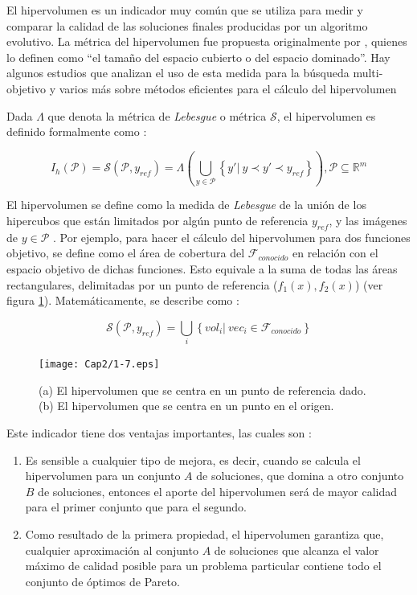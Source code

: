   El hipervolumen es un indicador muy com\'un que se utiliza para medir y comparar la calidad de las soluciones
  finales producidas por un algoritmo evolutivo. La m\'etrica del hipervolumen fue propuesta originalmente por
  \cite{Zitzler98on}, quienes lo definen como ``el tama\~no del espacio cubierto o del espacio dominado''. Hay algunos 
  estudios que analizan el uso de esta medida para la b\'usqueda multi-objetivo y varios m\'as sobre m\'etodos eficientes para 
  el c\'alculo del hipervolumen \cite{FonPaqhypervolume, BeuFon2009, Emmerich05anemo}

   \begin{definicion}  Dada $\Lambda$ que denota la m\'etrica de \textit{Lebesgue} 
   o m\'etrica $\mathcal{S}$, el hipervolumen es definido formalmente como \cite{EASMC}:

  \[
  I_h\left(\mathcal{P}\right) = \mathcal{S}(\mathcal{P},y_{ref}) = \Lambda \left(\bigcup_{y \in \mathcal{P}} \left\{ y' |~ y \prec y' \prec y_{ref} \right\} \right), 
  \mathcal{P} \subseteq \mathbb{R}^m
  \]
  
  El hipervolumen se define como la medida de \textit{Lebesgue} de la uni\'on de los hipercubos que est\'an limitados 
  por alg\'un punto de referencia $y_{ref}$, y las im\'agenes de $y \in \mathcal{P}$ \cite{zbt2006}. Por ejemplo,  para hacer el  
  c\'alculo del hipervolumen para dos funciones objetivo, se define como el \'area de cobertura del 
  $\mathcal{F}_{conocido}$ en  relaci\'on con el espacio objetivo de dichas funciones. Esto equivale a la suma de todas las \'areas 
  rectangulares, delimitadas por un punto de referencia ($f_1\left(x \right), f_2\left(x\right)$) (ver figura \ref{fig:hipervol}). 
  Matem\'aticamente, se describe como \cite{EASMC}:

 \[
  \mathcal{S}(\mathcal{P},y_{ref}) = \bigcup_{i} \left\{vol_i |~ vec_i \in \mathcal{F}_{conocido} \right\}
  \]
  \end{definicion}
  
 \begin{figure}
	\centering
	\texttt{[image: Cap2/1-7.eps]}
	  \caption [Hipervolumen por punto de referencia]{(a) El hipervolumen que se centra en un punto de referencia dado. 
	  (b) El hipervolumen que se centra en un punto en el origen.}
      \label{fig:hipervol}
      \end{figure}
 
  Este indicador tiene dos ventajas importantes, las cuales son \cite{zbt2006}:
  
  \begin{enumerate}
   \item  Es sensible a cualquier tipo de mejora, es decir, cuando se calcula el hipervolumen para un conjunto $A$ 
   de soluciones, que domina a otro conjunto $B$ de soluciones, entonces el aporte del hipervolumen ser\'a de mayor 
   calidad para el primer conjunto que para el segundo.
   \item Como resultado de la primera propiedad, el hipervolumen garantiza que, cualquier aproximaci\'on al conjunto 
   $A$ de soluciones que alcanza el valor m\'aximo de calidad posible para un problema particular contiene todo el 
   conjunto de \'optimos de Pareto. 
  \end{enumerate}

